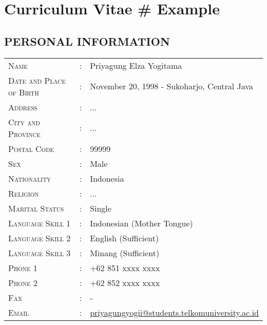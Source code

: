 \chapter{Curriculum Vitae \# Example} %

\label{appendix_cv} %


\section*{PERSONAL INFORMATION}

\begin{tabular}{lll}
	\textsc{Name} & : & Priyagung Elza Yogitama  \\
	\textsc{Date and Place of Birth} & : & November 20, 1998 - Sukoharjo, Central Java \\
	\textsc{Address} & : & ... \\
	\textsc{City and Province} & : & ... \\
	\textsc{Postal Code} & : & 99999 \\
	\textsc{Sex} & : & Male\\
	\textsc{Nationality} & : & Indonesia\\
	\textsc{Religion} & : & ...\\
	\textsc{Marital Status} & : & Single \\
	\textsc{Language Skill 1} & : & Indonesian (Mother Tongue)\\
	\textsc{Language Skill 2} & : & English (Sufficient)\\
	\textsc{Language Skill 3} & : & Minang (Sufficient)\\	
	\textsc{Phone 1} & : & +62 851 xxxx xxxx\\
	\textsc{Phone 2} & : & +62 852 xxxx xxxx\\
	\textsc{Fax} & : & -\\	
	\textsc{Email} & : & \href{mailto:youremail@students.telkomuniversity.ac.id}{priyagungyogii@students.telkomuniversity.ac.id}\\	
\end{tabular}

